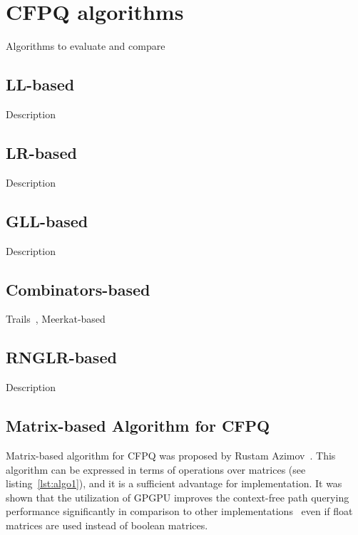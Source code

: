 \section{CFPQ algorithms}

Algorithms to evaluate and compare


\subsection{LL-based}

Description~\cite{Medeiros:2018:EEC:3167132.3167265}

\subsection{LR-based}

Description~\cite{10.1007/978-3-319-91662-0_17}

\subsection{GLL-based}

Description~\cite{Grigorev:2017:CPQ:3166094.3166104}

\subsection{Combinators-based}

Trails~\cite{Kroni:2013:PGA:2489837.2489844}, Meerkat-based~\cite{Verbitskaia:2018:PCC:3241653.3241655}

\subsection{RNGLR-based}

Description~\cite{10.1007/978-3-319-41579-6_22}


\subsection{Matrix-based Algorithm for CFPQ}

Matrix-based algorithm for CFPQ was proposed by Rustam Azimov~\cite{Azimov:2018:CPQ:3210259.3210264}.
This algorithm can be expressed in terms of operations over matrices (see listing~\ref{lst:algo1}), and it is a sufficient advantage for implementation.
It was shown that the utilization of GPGPU improves the context-free path querying performance significantly in comparison to other implementations~\cite{Azimov:2018:CPQ:3210259.3210264} even if float matrices are used instead of boolean matrices.

